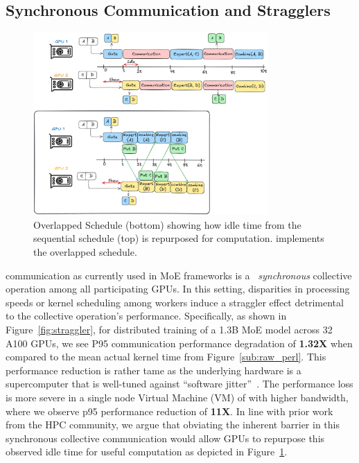 \subsection{Synchronous Communication and Stragglers}\label{sec:synchronous-communication-and-stragglers}
\begin{figure}[!ht]
    \centering
    \includegraphics[width=0.8\textwidth, keepaspectratio]{figures/s_overlap}
    \caption{Overlapped Schedule (bottom) showing how idle time from the sequential schedule (top)
        is repurposed for computation. \sysname implements the overlapped schedule.}
    \label{fig:overlap}
\end{figure}
\alltoall communication as currently used in MoE frameworks is a ~\emph{synchronous} collective operation among
all participating GPUs. In this setting, disparities in processing speeds or kernel scheduling
among workers induce a straggler effect detrimental to the collective operation's performance.
Specifically, as shown in Figure~\ref{fig:straggler}, for distributed training of a 1.3B MoE model across 32 A100 GPUs,
we see P95 communication performance degradation of \textbf{1.32X} when compared to the mean actual kernel time
from Figure~\ref{sub:raw_perl}.
This performance reduction is rather tame as the underlying hardware is a supercomputer that is
well-tuned against ``software jitter''~\cite{nerscNetworkNERSC}.
The performance loss is more severe in a single node Virtual Machine (VM) of with higher bandwidth,
where we observe p95 performance reduction of \textbf{11X}.
In line with prior work~\cite{1639320, 10.1145/3545008.3545056} from the HPC community,
we argue that obviating the inherent barrier in this synchronous collective communication would
allow GPUs to repurpose this observed idle time for useful computation as depicted in Figure~\ref{fig:overlap}.
